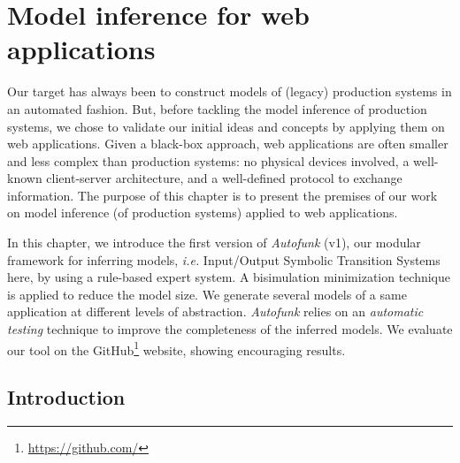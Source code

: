 \chapter{Model inference for web applications}
\label{sec:modelinf:webapps}

Our target has always been to construct models of (legacy)
production systems in an automated fashion. But, before tackling
the model inference of production systems, we chose to validate
our initial ideas and concepts by applying them on web
applications. Given a black-box approach, web applications are
often smaller and less complex than production systems: no
physical devices involved, a well-known client-server
architecture, and a well-defined protocol to exchange
information. The purpose of this chapter is to present the
premises of our work on model inference (of production systems)
applied to web applications.

In this chapter, we introduce the first version of
\textit{Autofunk} (v1), our modular framework for inferring
models, \emph{i.e.} Input/Output Symbolic Transition Systems
here, by using a rule-based expert system. A bisimulation
minimization technique \cite{Park:1981:CAI:647210.720030} is
applied to reduce the model size. We generate several models of a
same application at different levels of abstraction.
\textit{Autofunk} relies on an \emph{automatic testing} technique
to improve the completeness of the inferred models. We evaluate
our tool on the GitHub\footnote{\url{https://github.com/}}
website, showing encouraging results.\\

\minitoc

\pagebreak

\section{Introduction}

